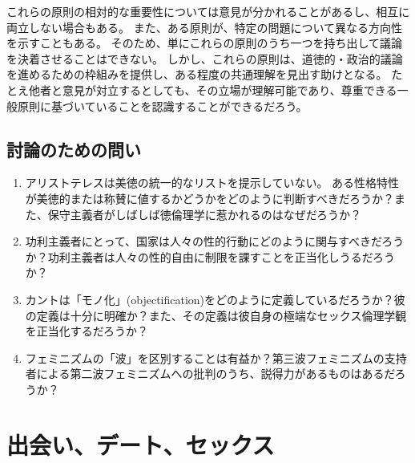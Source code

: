 \documentclass[paper=a4,book,openany]{jlreq}
\begin{document}
これらの原則の相対的な重要性については意見が分かれることがあるし、相互に両立しない場合もある。
また、ある原則が、特定の問題について異なる方向性を示すこともある。
そのため、単にこれらの原則のうち一つを持ち出して議論を決着させることはできない。
しかし、これらの原則は、道徳的・政治的議論を進めるための枠組みを提供し、ある程度の共通理解を見出す助けとなる。
たとえ他者と意見が対立するとしても、その立場が理解可能であり、尊重できる一般原則に基づいていることを認識することができるだろう。

\section{討論のための問い}
\begin{enumerate}
\item アリストテレスは美徳の統一的なリストを提示していない。
ある性格特性が美徳的または称賛に値するかどうかをどのように判断すべきだろうか？また、保守主義者がしばしば徳倫理学に惹かれるのはなぜだろうか？

    \item 功利主義者にとって、国家は人々の性的行動にどのように関与すべきだろうか？功利主義者は人々の性的自由に制限を課すことを正当化しうるだろうか？

    \item カントは「モノ化」(objectification)をどのように定義しているだろうか？彼の定義は十分に明確か？また、その定義は彼自身の極端なセックス倫理学観を正当化するだろうか？

    \item フェミニズムの「波」を区別することは有益か？第三波フェミニズムの支持者による第二波フェミニズムへの批判のうち、説得力があるものはあるだろうか？
\end{enumerate}

\chapter{出会い、デート、セックス}
\end{document}

